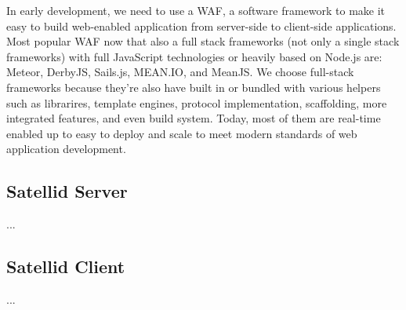 In early development, we need to use a \ac{WAF}, a software framework to make it easy to build web-enabled application from server-side to client-side applications.
Most popular \ac{WAF} now that also a full stack frameworks (not only a single stack frameworks) with full JavaScript technologies or heavily based on Node.js are: Meteor, DerbyJS, Sails.js, MEAN.IO, and MeanJS.
We choose full-stack frameworks because they're also have built in or bundled with various helpers such as librarires, template engines, protocol implementation, scaffolding, more integrated features, and even build system.
Today, most of them are real-time enabled up to easy to deploy and scale to meet modern standards of web application development.

\subsection{Satellid Server}

...

\subsection{Satellid Client}

...

